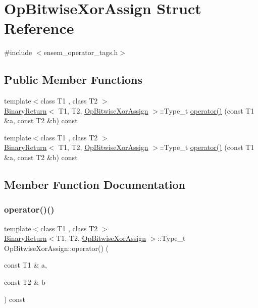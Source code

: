 \hypertarget{structOpBitwiseXorAssign}{}\section{Op\+Bitwise\+Xor\+Assign Struct Reference}
\label{structOpBitwiseXorAssign}


{\ttfamily \#include $<$ensem\+\_\+operator\+\_\+tags.\+h$>$}

\subsection*{Public Member Functions}
\begin{DoxyCompactItemize}
\item 
{\footnotesize template$<$class T1 , class T2 $>$ }\\\mbox{\hyperlink{structBinaryReturn}{Binary\+Return}}$<$ T1, T2, \mbox{\hyperlink{structOpBitwiseXorAssign}{Op\+Bitwise\+Xor\+Assign}} $>$\+::Type\+\_\+t \mbox{\hyperlink{structOpBitwiseXorAssign_a09ad5519029abdca1ad159742ed8ed89}{operator()}} (const T1 \&a, const T2 \&b) const
\item 
{\footnotesize template$<$class T1 , class T2 $>$ }\\\mbox{\hyperlink{structBinaryReturn}{Binary\+Return}}$<$ T1, T2, \mbox{\hyperlink{structOpBitwiseXorAssign}{Op\+Bitwise\+Xor\+Assign}} $>$\+::Type\+\_\+t \mbox{\hyperlink{structOpBitwiseXorAssign_a09ad5519029abdca1ad159742ed8ed89}{operator()}} (const T1 \&a, const T2 \&b) const
\end{DoxyCompactItemize}


\subsection{Member Function Documentation}
\mbox{\label{structOpBitwiseXorAssign_a09ad5519029abdca1ad159742ed8ed89}} 
\subsubsection{\texorpdfstring{operator()()}{operator()()}\hspace{0.1cm}{\footnotesize\ttfamily [1/2]}}
{\footnotesize\ttfamily template$<$class T1 , class T2 $>$ \\
\mbox{\hyperlink{structBinaryReturn}{Binary\+Return}}$<$T1, T2, \mbox{\hyperlink{structOpBitwiseXorAssign}{Op\+Bitwise\+Xor\+Assign}} $>$\+::Type\+\_\+t Op\+Bitwise\+Xor\+Assign\+::operator() (\begin{DoxyParamCaption}\item[{const T1 \&}]{a,  }\item[{const T2 \&}]{b }\end{DoxyParamCaption}) const\hspace{0.3cm}{\ttfamily [inline]}}

